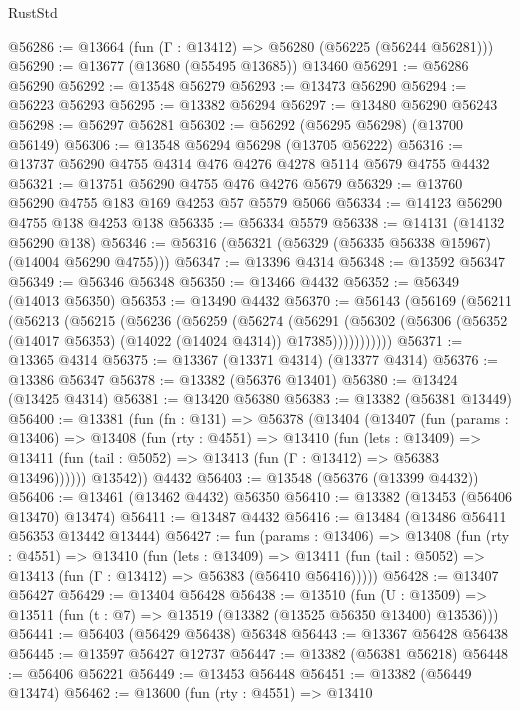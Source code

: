 \begin{lexlean}{RustStd}
\begin{coremodule}
@56286 := @13664 (fun (Γ : @13412) => @56280 (@56225 (@56244 @56281)))
@56290 := @13677 (@13680 (@55495 @13685)) @13460
@56291 := @56286 @56290
@56292 := @13548 @56279
@56293 := @13473 @56290
@56294 := @56223 @56293
@56295 := @13382 @56294
@56297 := @13480 @56290 @56243
@56298 := @56297 @56281
@56302 := @56292 (@56295 @56298) (@13700 @56149)
@56306 := @13548 @56294 @56298 (@13705 @56222)
@56316 := @13737 @56290 @4755 @4314 @476 @4276 @4278 @5114 @5679 @4755 @4432
@56321 := @13751 @56290 @4755 @476 @4276 @5679
@56329 := @13760 @56290 @4755 @183 @169 @4253 @57 @5579 @5066
@56334 := @14123 @56290 @4755 @138 @4253 @138
@56335 := @56334 @5579
@56338 := @14131 (@14132 @56290 @138)
@56346 := @56316 (@56321 (@56329 (@56335 @56338 @15967) (@14004 @56290 @4755)))
@56347 := @13396 @4314
@56348 := @13592 @56347
@56349 := @56346 @56348
@56350 := @13466 @4432
@56352 := @56349 (@14013 @56350)
@56353 := @13490 @4432
@56370 := @56143
    (@56169
      (@56211
        (@56213
          (@56215
            (@56236
              (@56259
                (@56274
                  (@56291
                    (@56302
                      (@56306 (@56352 (@14017 @56353) (@14022 (@14024 @4314)) @17385)))))))))))
@56371 := @13365 @4314
@56375 := @13367 (@13371 @4314) (@13377 @4314)
@56376 := @13386 @56347
@56378 := @13382 (@56376 @13401)
@56380 := @13424 (@13425 @4314)
@56381 := @13420 @56380
@56383 := @13382 (@56381 @13449)
@56400 := @13381
    (fun (fn : @131) =>
    @56378
      (@13404
        (@13407
          (fun (params : @13406) =>
          @13408
            (fun (rty : @4551) =>
            @13410
              (fun (lets : @13409) =>
              @13411 (fun (tail : @5052) => @13413 (fun (Γ : @13412) => @56383 @13496))))))
        @13542))
    @4432
@56403 := @13548 (@56376 (@13399 @4432))
@56406 := @13461 (@13462 @4432) @56350
@56410 := @13382 (@13453 (@56406 @13470) @13474)
@56411 := @13487 @4432
@56416 := @13484 (@13486 @56411 @56353 @13442 @13444)
@56427 := fun (params : @13406) =>
  @13408
    (fun (rty : @4551) =>
    @13410
      (fun (lets : @13409) =>
      @13411 (fun (tail : @5052) => @13413 (fun (Γ : @13412) => @56383 (@56410 @56416)))))
@56428 := @13407 @56427
@56429 := @13404 @56428
@56438 := @13510
    (fun (U : @13509) => @13511 (fun (t : @7) => @13519 (@13382 (@13525 @56350 @13400) @13536)))
@56441 := @56403 (@56429 @56438) @56348
@56443 := @13367 @56428 @56438
@56445 := @13597 @56427 @12737
@56447 := @13382 (@56381 @56218)
@56448 := @56406 @56221
@56449 := @13453 @56448
@56451 := @13382 (@56449 @13474)
@56462 := @13600
    (fun (rty : @4551) =>
    @13410

\end{coremodule}
\end{lexlean}
